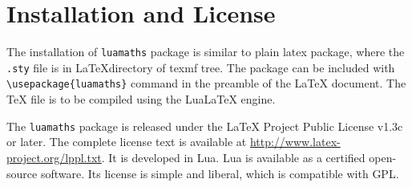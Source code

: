 \documentclass{article}
\begin{document}
\section{Installation and License}

The installation of \verb|luamaths| package is similar to plain latex package, where the \texttt{.sty} file is in \LaTeX directory of texmf tree. The package can be included with \verb|\usepackage{luamaths}| command in the preamble of the LaTeX document. The TeX file is to be compiled using the LuaLaTeX engine.


The \verb|luamaths| package is released under the LaTeX Project Public License v1.3c or later. The complete license text is available at \url{http://www.latex-project.org/lppl.txt}. It is developed in Lua.  Lua is available as a certified open-source software. Its license is simple and liberal, which is compatible with GPL.
\end{document}
